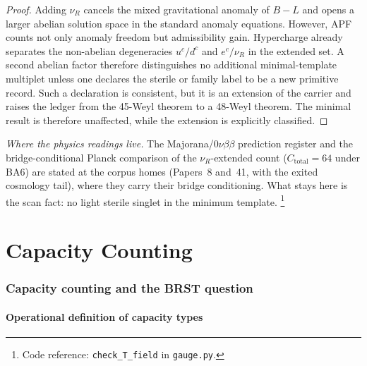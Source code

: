 \documentclass[11pt]{article}
\theoremstyle{definition}
\newcommand{\coderef}[2]{\footnote{Code reference: \texttt{#1} in \texttt{#2}.}}
\begin{document}
\begin{proof}
Adding $\nu_R$ cancels the mixed gravitational anomaly of $B-L$ and opens a
larger abelian solution space in the standard anomaly equations.  However,
APF counts not only anomaly freedom but admissibility gain.  Hypercharge already
separates the non-abelian degeneracies $u^c/d^c$ and $e^c/\nu_R$ in the
extended set.  A second abelian factor therefore distinguishes no additional
minimal-template multiplet unless one declares the sterile or family label to
be a new primitive record.  Such a declaration is consistent, but it is an
extension of the carrier and raises the ledger from the 45-Weyl theorem to a
48-Weyl theorem.  The minimal result is therefore unaffected, while the
extension is explicitly classified.
\end{proof}

\smallskip\noindent\textit{Where the physics readings live.}\quad
The Majorana/$0\nu\beta\beta$ prediction register and the
bridge-conditional Planck comparison of the $\nu_R$-extended count
($C_{\mathrm{total}} = 64$ under BA6) are stated at the corpus homes
(Papers~8 and~41, with the exited cosmology tail), where they carry
their bridge conditioning.  What stays here is the scan fact: no
light sterile singlet in the minimum template.
\coderef{check\_T\_field}{gauge.py}


\newpage


\part{Capacity Counting}
\label{part:cosmo}


\section{Capacity counting and the BRST question}
\label{sec:capacity_count}


\subsection{Operational definition of capacity types}
\end{document}
